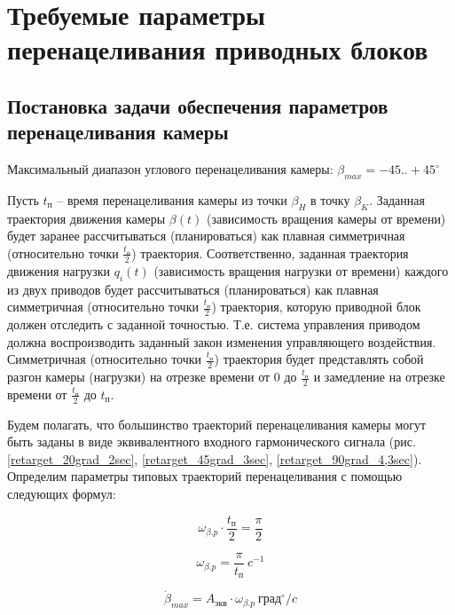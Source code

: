 \newpage
\section{Требуемые параметры перенацеливания приводных блоков}

\subsection{Постановка задачи обеспечения параметров перенацеливания камеры}

Максимальный диапазон углового перенацеливания камеры:
$\beta_{max} = -45..+45^{\circ}$

Пусть $t_\text{п}$ – время перенацеливания камеры из точки $\beta_{H}$ в точку $\beta_{K}$.
Заданная траектория движения камеры $\beta(t)$ (зависимость вращения камеры от времени) будет заранее рассчитываться (планироваться) как плавная симметричная (относительно точки $\frac{t_\text{п} }{2}$) траектория.
Соответственно, заданная траектория движения нагрузки $q_{i}(t)$ (зависимость вращения нагрузки от времени) каждого из двух приводов будет рассчитываться (планироваться) как плавная симметричная (относительно точки $\frac{t_\text{п} }{2}$) траектория, которую приводной блок должен отследить с заданной точностью.
Т.е. система управления приводом должна воспроизводить заданный закон изменения управляющего воздействия.
Симметричная (относительно точки $\frac{t_\text{п} }{2}$) траектория будет представлять собой разгон камеры (нагрузки) на отрезке времени от 0 до $\frac{t_\text{п} }{2}$ и замедление на отрезке времени от $\frac{t_\text{п} }{2}$ до $t_\text{п}$.

Будем полагать, что большинство траекторий перенацеливания камеры могут быть заданы в виде эквивалентного входного гармонического сигнала (рис. \ref{retarget_20grad_2sec}, \ref{retarget_45grad_3sec}, \ref{retarget_90grad_4,3sec}).
Определим параметры типовых траекторий перенацеливания с помощью следующих формул:

\begin{equation}
    \label{retarget_angle}
    \omega_{\beta.p} \cdot \frac{t_\text{п} }{2} = \frac{\pi}{2}
\end{equation}

\begin{equation}
    \label{equiv_signal_frequency}
    \omega_{\beta.p} = \frac{\pi}{t_\text{п} } ~c^{-1}
\end{equation}

\begin{equation}
    \label{max_speed_for_equiv_signal}
    \dot{\beta}_{max} = A_\text{экв} \cdot \omega_{\beta.p} ~\text{град}^{\circ} / c
\end{equation}

